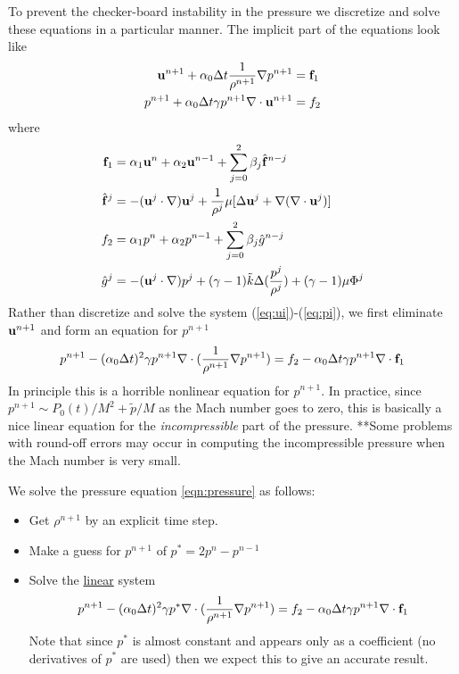 \documentclass{article}
\begin{document}
\newcommand{\dx}{{\Delta x}}
\newcommand{\pf}{\tilde{p}}   
To prevent the checker-board instability in the pressure we discretize and solve these
equations in a particular manner. The implicit part of the equations look like
\begin{align}
   {\bf u}^{n+1} + \alpha_0 {\Delta t} {1\over\rho^{n+1}}\nabla p^{n+1} &= {\bf f}_1  \label{eq:ui} \\
   p^{n+1} + \alpha_0 {\Delta t} \gamma p^{n+1} \nabla\cdot{\bf u}^{n+1} &= f_2   \label{eq:pi}
\end{align}
where
\begin{align}
  {\bf f}_1 & = \alpha_1 {\bf u}^{n} + \alpha_2 {\bf u}^{n-1} + \sum_{j=0}^2 \beta_j \hat{{\bf f}}^{n-j} \\
  \hat{{\bf f}}^{j} &= -({\bf u}^j \cdot\nabla){\bf u}^j  + {1\over\rho^j } \mu [\Delta {\bf u}^j  + \nabla(\nabla\cdot{\bf u}^j ) ] \\
  f_2 &= \alpha_1 p^{n} + \alpha_2 p^{n-1} + \sum_{j=0}^2 \beta_j \hat{g}^{n-j} \\
  \hat{g}^j &= -({\bf u}^j\cdot\nabla) p^j + (\gamma-1)\tilde{k} \Delta({p^j\over \rho^j}) +(\gamma-1)\mu \Phi^j
\end{align}
Rather than discretize and solve the system (\ref{eq:ui})-(\ref{eq:pi}), we first eliminate ${\bf u}^{n+1}$ and
form an equation for $p^{n+1}$
\begin{equation} \label{eqn:pressure}
   p^{n+1} - (\alpha_0{\Delta t})^2 \gamma p^{n+1} \nabla\cdot( {1\over\rho^{n+1}}\nabla p^{n+1} ) 
          = f_2 -   \alpha_0{\Delta t} \gamma p^{n+1} \nabla\cdot{\bf f}_1
\end{equation}
In principle this is a horrible nonlinear equation for $p^{n+1}$. In practice, since
$p^{n+1} \sim P_0(t)/M^2 + \pf/M$ as the Mach number goes to zero, this is basically
a nice linear equation for the {\sl incompressible} part of the pressure.
**Some problems with round-off errors may occur in computing the incompressible
pressure when the Mach number is very small.

We solve the pressure equation \ref{eqn:pressure} as follows:
\begin{itemize}
  \item Get $\rho^{n+1}$ by an explicit time step.
  \item Make a guess for $p^{n+1}$ of $p^* = 2 p^n - p^{n-1}$
  \item Solve the \underline{linear} system
\begin{equation} \label{eqn:pressure2}
   p^{n+1} - (\alpha_0{\Delta t})^2 \gamma p^* \nabla\cdot( {1\over\rho^{n+1}}\nabla p^{n+1} ) 
          = f_2 -   \alpha_0{\Delta t} \gamma p^{n+1} \nabla\cdot{\bf f}_1
\end{equation}
    Note that since $p^*$ is almost constant and appears only as a coefficient (no derivatives
    of $p^*$ are used) then we expect this to give an accurate result.
\end{itemize}
\end{document}
